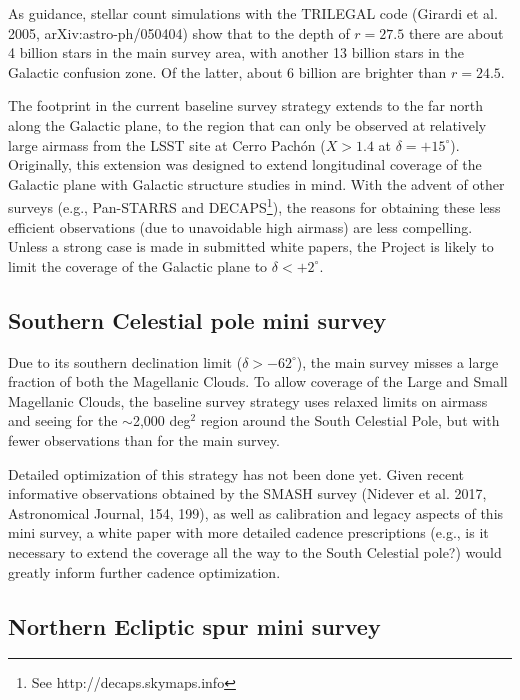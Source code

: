 \documentclass[DM,lsstdraft,toc,usenatbib]{lsstdoc}
\begin{document}
As guidance, stellar count simulations with the TRILEGAL code (Girardi et al. 2005, 
arXiv:astro-ph/050404) show that to the depth of $r=27.5$ there are about 4 billion
stars in the main survey area, with another 13 billion stars in the Galactic confusion 
zone. Of the latter, about 6 billion are brighter than $r=24.5$.  

The footprint in the current baseline survey strategy extends to the far north along the Galactic
plane, to the region that can only be observed at relatively large airmass from the LSST
site at Cerro Pach\'on ($X>1.4$ at $\delta  = +15^\circ$). Originally, this extension was designed 
to extend longitudinal coverage of the Galactic plane with Galactic structure studies in mind. 
With the advent of other surveys (e.g., Pan-STARRS and DECAPS\footnote{See http://decaps.skymaps.info}), 
the reasons for obtaining these less efficient observations (due to unavoidable high airmass) are less compelling. 
Unless a strong case is made in submitted white papers, the Project is likely to limit the 
coverage of the Galactic plane to $\delta < +2^\circ$. 


\subsection{Southern Celestial pole mini survey}

Due to its southern declination limit ($\delta > -62^\circ$), the main survey misses a large fraction
of both the Magellanic Clouds. To allow coverage of the Large and Small Magellanic Clouds, the 
baseline survey strategy uses relaxed limits on airmass and seeing for the $\sim$2,000 deg$^2$ region 
around the South Celestial Pole, but with fewer observations than for the main survey. 

Detailed optimization of this strategy has not been done yet. Given recent informative observations 
obtained by the SMASH survey (Nidever et al. 2017, Astronomical Journal, 154, 199), as well as calibration 
and legacy aspects of this mini survey, a white paper with more detailed cadence prescriptions
(e.g., is it necessary to extend the coverage all the way to the South Celestial pole?) would greatly 
inform further cadence optimization. 


\subsection{Northern Ecliptic spur mini survey}
\end{document}
